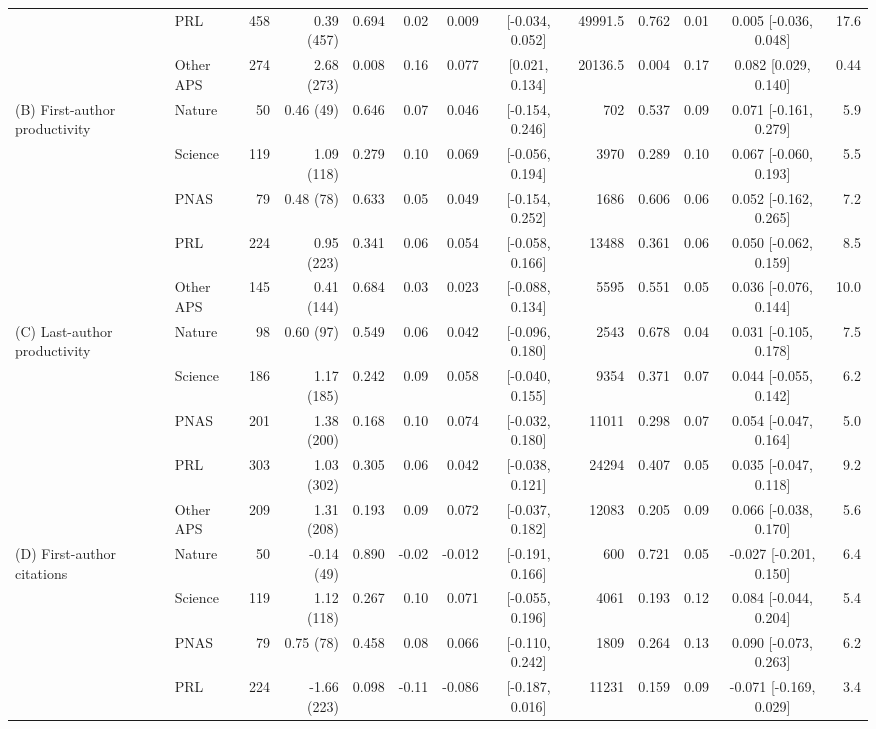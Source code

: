 {\begin{tabular}{llrrrrrcrrrcr}
 & PRL & 458 & 0.39 (457) & 0.694 & 0.02 & 0.009 & [-0.034, 0.052] & 49991.5 & 0.762 & 0.01 & 0.005 [-0.036, 0.048] & 17.6 \\
 & Other APS & 274 & 2.68 (273) & 0.008 & 0.16 & 0.077 & [0.021, 0.134] & 20136.5 & 0.004 & 0.17 & 0.082 [0.029, 0.140] & 0.44 \\
\midrule
(B) First-author productivity & Nature & 50 & 0.46 (49) & 0.646 & 0.07 & 0.046 & [-0.154, 0.246] & 702 & 0.537 & 0.09 & 0.071 [-0.161, 0.279] & 5.9 \\
 & Science & 119 & 1.09 (118) & 0.279 & 0.10 & 0.069 & [-0.056, 0.194] & 3970 & 0.289 & 0.10 & 0.067 [-0.060, 0.193] & 5.5 \\
 & PNAS & 79 & 0.48 (78) & 0.633 & 0.05 & 0.049 & [-0.154, 0.252] & 1686 & 0.606 & 0.06 & 0.052 [-0.162, 0.265] & 7.2 \\
 & PRL & 224 & 0.95 (223) & 0.341 & 0.06 & 0.054 & [-0.058, 0.166] & 13488 & 0.361 & 0.06 & 0.050 [-0.062, 0.159] & 8.5 \\
 & Other APS & 145 & 0.41 (144) & 0.684 & 0.03 & 0.023 & [-0.088, 0.134] & 5595 & 0.551 & 0.05 & 0.036 [-0.076, 0.144] & 10.0 \\
\midrule
(C) Last-author productivity & Nature & 98 & 0.60 (97) & 0.549 & 0.06 & 0.042 & [-0.096, 0.180] & 2543 & 0.678 & 0.04 & 0.031 [-0.105, 0.178] & 7.5 \\
 & Science & 186 & 1.17 (185) & 0.242 & 0.09 & 0.058 & [-0.040, 0.155] & 9354 & 0.371 & 0.07 & 0.044 [-0.055, 0.142] & 6.2 \\
 & PNAS & 201 & 1.38 (200) & 0.168 & 0.10 & 0.074 & [-0.032, 0.180] & 11011 & 0.298 & 0.07 & 0.054 [-0.047, 0.164] & 5.0 \\
 & PRL & 303 & 1.03 (302) & 0.305 & 0.06 & 0.042 & [-0.038, 0.121] & 24294 & 0.407 & 0.05 & 0.035 [-0.047, 0.118] & 9.2 \\
 & Other APS & 209 & 1.31 (208) & 0.193 & 0.09 & 0.072 & [-0.037, 0.182] & 12083 & 0.205 & 0.09 & 0.066 [-0.038, 0.170] & 5.6 \\
\midrule
(D) First-author citations & Nature & 50 & -0.14 (49) & 0.890 & -0.02 & -0.012 & [-0.191, 0.166] & 600 & 0.721 & 0.05 & -0.027 [-0.201, 0.150] & 6.4 \\
 & Science & 119 & 1.12 (118) & 0.267 & 0.10 & 0.071 & [-0.055, 0.196] & 4061 & 0.193 & 0.12 & 0.084 [-0.044, 0.204] & 5.4 \\
 & PNAS & 79 & 0.75 (78) & 0.458 & 0.08 & 0.066 & [-0.110, 0.242] & 1809 & 0.264 & 0.13 & 0.090 [-0.073, 0.263] & 6.2 \\
 & PRL & 224 & -1.66 (223) & 0.098 & -0.11 & -0.086 & [-0.187, 0.016] & 11231 & 0.159 & 0.09 & -0.071 [-0.169, 0.029] & 3.4 \\

\end{tabular}}
